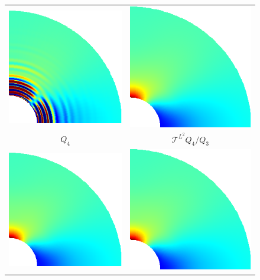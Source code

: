 \documentclass{article}
\begin{document}
\begin{figure}[htb!]
    \center
    \begin{tabular}{cc}
    \includegraphics[width=.4\linewidth]{no_stress_contour} & \includegraphics[width=.4\linewidth]{g_stress_contour}\\
    $Q_4$ & $\mathcal{T}^{L^2} Q_4/Q_3$\\
    \includegraphics[width=.4\linewidth]{s_stress_contour} & \includegraphics[width=.4\linewidth]{ns_stress_contour}\\

\end{tabular}
\end{figure}
\end{document}
